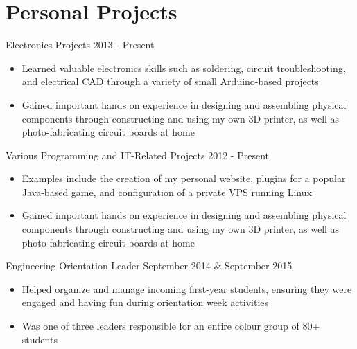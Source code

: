 \documentclass[hidelinks]{kkurucz-cv}
\begin{document}

\section{Personal Projects}
\begin{entrylist}
\entry
{\vspace{-8mm}\null}
{Electronics Projects}
{2013 - Present}
{
\vspace{-3mm}
\begin{itemize}
	\item Learned valuable electronics skills such as soldering, circuit troubleshooting, and electrical CAD through a variety of small Arduino-based projects
	\item Gained important hands on experience in designing and assembling physical components through constructing and using my own 3D printer, as well as photo-fabricating circuit boards at home
\end{itemize}
}
{\null}
\entry
{\vspace{-8mm}\null}
{Various Programming and IT-Related Projects}
{2012 - Present}
{
\vspace{-3mm}
\begin{itemize}
	\item Examples include the creation of my personal website, plugins for a popular Java-based game, and configuration of a private VPS running Linux
	\item Gained important hands on experience in designing and assembling physical components through constructing and using my own 3D printer, as well as photo-fabricating circuit boards at home
\end{itemize}
}
{\null}
\entry
{\vspace{-8mm}\null}
{Engineering Orientation Leader}
{September 2014 \& September 2015}
{
\vspace{-3mm}
\begin{itemize}
	\item Helped organize and manage incoming first-year students, ensuring they were engaged and having fun during orientation week activities
	\item Was one of three leaders responsible for an entire colour group of 80+ students
	\end{itemize}
}
{\null}
\end{entrylist}
\end{document}
